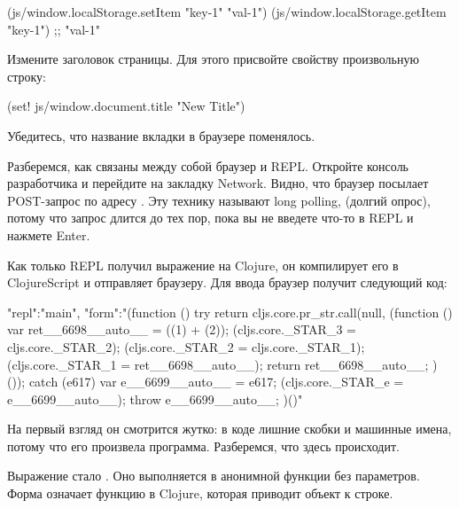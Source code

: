 \begin{english}
  \begin{clojure}
(js/window.localStorage.setItem "key-1" "val-1")
(js/window.localStorage.getItem "key-1")
;; "val-1"
  \end{clojure}
\end{english}

Измените заголовок страницы. Для этого присвойте свойству  произвольную строку:

\begin{english}
  \begin{clojure}
(set! js/window.document.title "New Title")
  \end{clojure}
\end{english}

Убедитесь, что название вкладки в браузере поменялось.

Разберемся, как связаны между собой браузер и REPL. Откройте консоль разработчика и перейдите на закладку Network. Видно, что браузер посылает POST-запрос по адресу . Эту технику называют long polling, (долгий опрос), потому что запрос длится до тех пор, пока вы не введете что-то в REPL и нажмете Enter.

Как только REPL получил выражение на Clojure, он компилирует его в ClojureScript и отправляет браузеру. Для ввода  браузер получит следующий код:

\begin{english}
  \begin{json}
{"repl":"main", "form":"(function () {
  try {
    return cljs.core.pr_str.call(null, (function () {
      var ret__6698__auto__ = ((1) + (2));
      (cljs.core._STAR_3 = cljs.core._STAR_2);
      (cljs.core._STAR_2 = cljs.core._STAR_1);
      (cljs.core._STAR_1 = ret__6698__auto__);
      return ret__6698__auto__;
    })());
  } catch (e617) {
    var e__6699__auto__ = e617;
    (cljs.core._STAR_e = e__6699__auto__);
    throw e__6699__auto__;
  }
})()"}
  \end{json}
\end{english}

На первый взгляд он смотрится жутко: в коде лишние скобки и машинные имена, потому что его произвела программа. Разберемся, что здесь происходит.

Выражение  стало . Оно выполняется в анонимной функции без параметров. Форма  означает функцию  в Clojure, которая приводит объект к строке.

